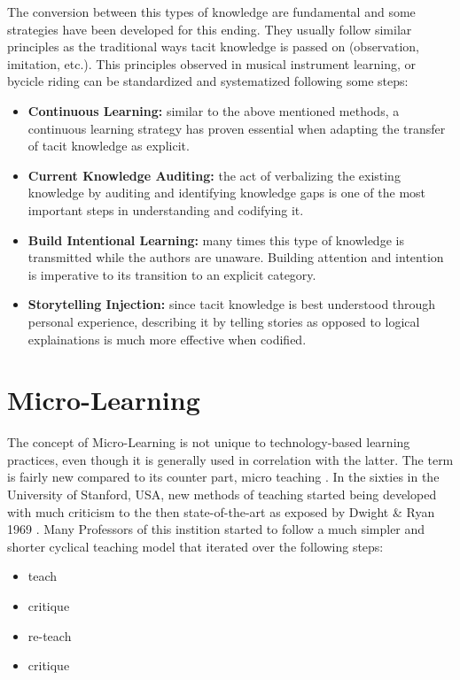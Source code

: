 The conversion between this types of knowledge are fundamental and some strategies 
have been developed for this ending. They usually follow similar principles as the 
traditional ways tacit knowledge is passed on (observation, imitation, etc.). This
principles observed in musical instrument learning, or bycicle riding can be 
standardized and systematized following some steps:

\begin{itemize}
    \item \textbf{Continuous Learning:} similar to the above mentioned methods, 
        a continuous learning strategy has proven essential when adapting the transfer
        of tacit knowledge as explicit.
    \item \textbf{Current Knowledge Auditing:}
        the act of verbalizing the existing knowledge by auditing and identifying 
        knowledge gaps is one of the most important steps in understanding and 
        codifying it.
    \item \textbf{Build Intentional Learning:}
        many times this type of knowledge is transmitted while the authors are 
        unaware. Building attention and intention is imperative to its transition to
        an explicit category.
    \item \textbf{Storytelling Injection:}
        since tacit knowledge is best understood through personal experience, 
        describing it by telling stories as opposed to logical explainations 
        is much more effective when codified.
\end{itemize}



\section{Micro-Learning}

The concept of Micro-Learning is not unique to technology-based learning practices,
even though it is generally used in correlation with the latter. The term is fairly
new compared to its counter part, micro teaching \cite{microlearningdimensions}. 
In the sixties in the University of Stanford, USA, new methods of teaching started 
being developed with much criticism to the then state-of-the-art as exposed by 
Dwight \& Ryan 1969 \cite{dwight_ryan_1969}. Many Professors of this instition started
to follow a much simpler and shorter cyclical teaching model that iterated over
the following steps:

\begin{itemize}
    \item teach
    \item critique
    \item re-teach
    \item critique
\end{itemize}

